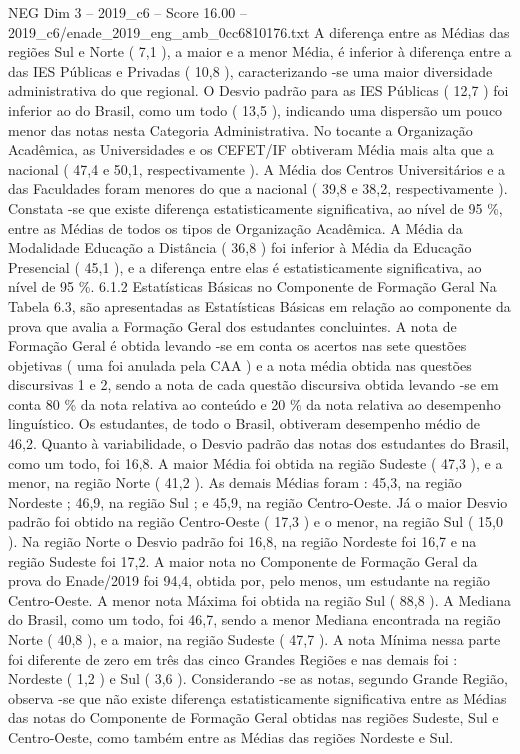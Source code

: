 \begin{textsample}{NEG Dim 3 – 2019\_c6 – Score 16.00 – 2019\_c6/enade\_2019\_eng\_amb\_0cc6810176.txt}
A diferença entre as Médias das regiões Sul e Norte ( 7,1 ), a maior e a menor Média, é inferior à diferença entre a das IES Públicas e Privadas ( 10,8 ), caracterizando -se uma maior diversidade administrativa do que regional.
O Desvio padrão para as IES Públicas ( 12,7 ) foi inferior ao do Brasil, como um todo ( 13,5 ), indicando uma dispersão um pouco menor das notas nesta Categoria Administrativa.
No tocante a Organização Acadêmica, as Universidades e os CEFET/IF obtiveram Média mais alta que a nacional ( 47,4 e 50,1, respectivamente ).
A Média dos Centros Universitários e a das Faculdades foram menores do que a nacional ( 39,8 e 38,2, respectivamente ).
Constata -se que existe diferença estatisticamente significativa, ao nível de 95 \%, entre as Médias de todos os tipos de Organização Acadêmica.
A Média da Modalidade Educação a Distância ( 36,8 ) foi inferior à Média da Educação Presencial ( 45,1 ), e a diferença entre elas é estatisticamente significativa, ao nível de 95 \%. 6.1.2 Estatísticas Básicas no Componente de Formação Geral Na Tabela 6.3, são apresentadas as Estatísticas Básicas em relação ao componente da prova que avalia a Formação Geral dos estudantes concluintes.
A nota de Formação Geral é obtida levando -se em conta os acertos nas sete questões objetivas ( uma foi anulada pela CAA ) e a nota média obtida nas questões discursivas 1 e 2, sendo a nota de cada questão discursiva obtida levando -se em conta 80 \% da nota relativa ao conteúdo e 20 \% da nota relativa ao desempenho linguístico.
Os estudantes, de todo o Brasil, obtiveram desempenho médio de 46,2.
Quanto à variabilidade, o Desvio padrão das notas dos estudantes do Brasil, como um todo, foi 16,8.
A maior Média foi obtida na região Sudeste ( 47,3 ), e a menor, na região Norte ( 41,2 ).
As demais Médias foram : 45,3, na região Nordeste ; 46,9, na região Sul ; e 45,9, na região Centro-Oeste.
Já o maior Desvio padrão foi obtido na região Centro-Oeste ( 17,3 ) e o menor, na região Sul ( 15,0 ).
Na região Norte o Desvio padrão foi 16,8, na região Nordeste foi 16,7 e na região Sudeste foi 17,2.
A maior nota no Componente de Formação Geral da prova do Enade/2019 foi 94,4, obtida por, pelo menos, um estudante na região Centro-Oeste.
A menor nota Máxima foi obtida na região Sul ( 88,8 ).
A Mediana do Brasil, como um todo, foi 46,7, sendo a menor Mediana encontrada na região Norte ( 40,8 ), e a maior, na região Sudeste ( 47,7 ).
A nota Mínima nessa parte foi diferente de zero em três das cinco Grandes Regiões e nas demais foi : Nordeste ( 1,2 ) e Sul ( 3,6 ).
Considerando -se as notas, segundo Grande Região, observa -se que não existe diferença estatisticamente significativa entre as Médias das notas do Componente de Formação Geral obtidas nas regiões Sudeste, Sul e Centro-Oeste, como também entre as Médias das regiões Nordeste e Sul.

\end{textsample}
